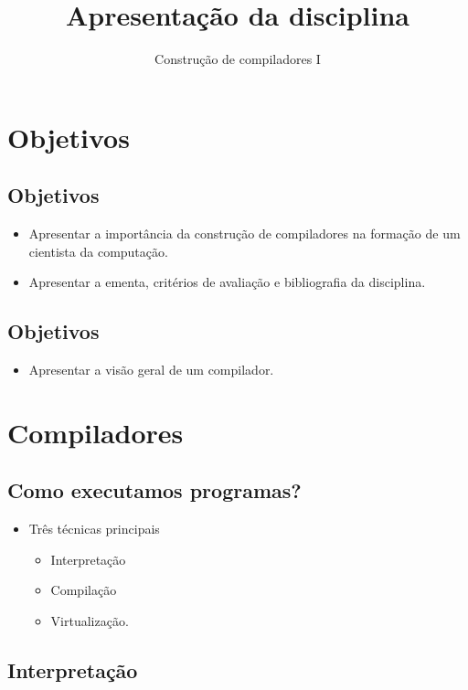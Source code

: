 \documentclass[11pt]{article}
\author{Construção de compiladores I}
\date{}
\title{Apresentação da disciplina}
\begin{document}
\maketitle
\section*{Objetivos}
\label{sec:orgca11612}

\subsection*{Objetivos}
\label{sec:org56a0287}

\begin{itemize}
\item Apresentar a importância da construção de compiladores na formação de um cientista da computação.
\item Apresentar a ementa, critérios de avaliação e bibliografia da disciplina.
\end{itemize}
\subsection*{Objetivos}
\label{sec:org93e215a}

\begin{itemize}
\item Apresentar a visão geral de um compilador.
\end{itemize}
\section*{Compiladores}
\label{sec:org22f1067}

\subsection*{Como executamos programas?}
\label{sec:orgcd3cd06}
\begin{itemize}
\item Três técnicas principais
\begin{itemize}
\item Interpretação
\item Compilação
\item Virtualização.
\end{itemize}
\end{itemize}
\subsection*{Interpretação}
\label{sec:orga744a83}
\end{document}
